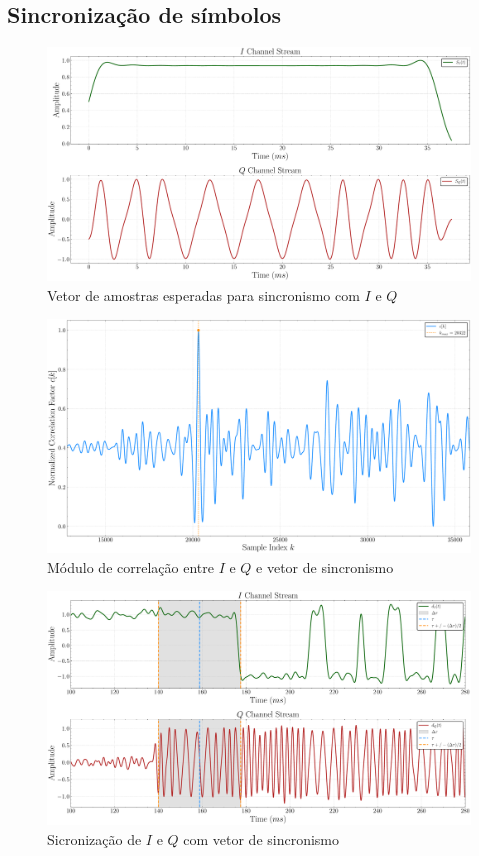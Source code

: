 \subsection{Sincronização de símbolos}\label{sec:sincronizacao}

\begin{figure}[H]
	\centering
	\caption{Vetor de amostras esperadas para sincronismo com $I$ e $Q$}\label{fig:receiver_sync_word}
	\includegraphics[width=\linewidth]{assets/cap3/example_synchronizer_word.pdf}
\end{figure}

\begin{figure}[H]
	\centering
	\caption{Módulo de correlação entre $I$ e $Q$ e vetor de sincronismo}\label{fig:receiver_corr}
	\includegraphics[width=\linewidth]{assets/cap3/receiver_sync_corr.pdf}
\end{figure}

\begin{figure}[H]
	\centering
	\caption{Sicronização de $I$ e $Q$ com vetor de sincronismo}\label{fig:receiver_sync}
	\includegraphics[width=\linewidth]{assets/cap3/receiver_sync_time.pdf}
\end{figure}


